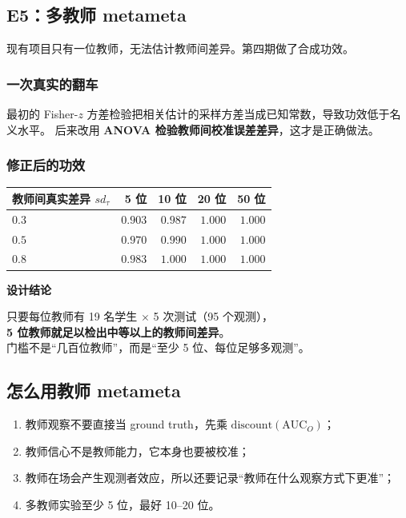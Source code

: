 \documentclass[UTF8,a4paper,11pt]{ctexart}
\newenvironment{explainbox}[1]
{\begin{center}\begin{minipage}{0.94\textwidth}\colorbox{boxbg}{\parbox{0.92\textwidth}{\textbf{#1}\par\vspace{2pt}}}}
{\end{minipage}\end{center}}
\begin{document}
\subsection{E5：多教师 metameta}

现有项目只有一位教师，无法估计教师间差异。第四期做了合成功效。

\subsubsection{一次真实的翻车}

最初的 Fisher-$z$ 方差检验把相关估计的采样方差当成已知常数，导致功效低于名义水平。
后来改用 \textbf{ANOVA 检验教师间校准误差差异}，这才是正确做法。

\subsubsection{修正后的功效}

\begin{center}
\begin{longtable}{@{}lrrrr@{}}
\toprule
\textbf{教师间真实差异 $sd_\tau$} & \textbf{5 位} & \textbf{10 位} & \textbf{20 位} & \textbf{50 位} \\
\midrule
$0.3$ & $0.903$ & $0.987$ & $1.000$ & $1.000$ \\
$0.5$ & $0.970$ & $0.990$ & $1.000$ & $1.000$ \\
$0.8$ & $0.983$ & $1.000$ & $1.000$ & $1.000$ \\
\bottomrule
\end{longtable}
\end{center}

\begin{explainbox}{设计结论}
只要每位教师有 19 名学生 $\times$ 5 次测试（95 个观测），\\
\textbf{5 位教师就足以检出中等以上的教师间差异}。\\
门槛不是“几百位教师”，而是“至少 5 位、每位足够多观测”。
\end{explainbox}

\subsection{怎么用教师 metameta}

\begin{enumerate}[leftmargin=2em]
\item 教师观察不要直接当 ground truth，先乘 $\mathrm{discount}(\mathrm{AUC}_O)$；
\item 教师信心不是教师能力，它本身也要被校准；
\item 教师在场会产生观测者效应，所以还要记录“教师在什么观察方式下更准”；
\item 多教师实验至少 5 位，最好 10--20 位。
\end{enumerate}
\end{document}
